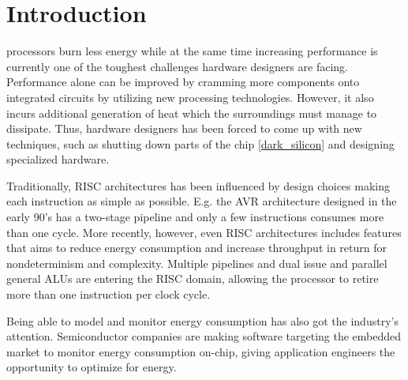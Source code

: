 \section{Introduction}

 processors burn less energy while at the same time
increasing performance is currently one of the toughest challenges hardware
designers are facing. Performance alone can be improved by cramming more
components onto integrated circuits \cite{moore1965cramming} by utilizing new
processing technologies. However, it also incurs additional generation of heat
which the surroundings must manage to dissipate. Thus, hardware designers has
been forced to come up with new techniques, such as shutting down parts of the
chip \ref{dark_silicon} and designing specialized hardware.

Traditionally, RISC architectures has been influenced by design choices making
each instruction as simple as possible\cite{sivarama}. E.g. the AVR architecture
designed in the early 90's has a two-stage pipeline and only a few instructions
consumes more than one cycle. More recently, however, even RISC architectures
includes features that aims to reduce energy consumption and increase throughput
in return for nondeterminism and complexity. Multiple pipelines and dual issue
and parallel general ALUs are entering the RISC domain, allowing the processor
to retire more than one instruction per clock cycle.



Being able to model and monitor energy consumption has also got the industry's
attention. Semiconductor companies are making software targeting the embedded
market to monitor energy consumption on-chip, giving application engineers the
opportunity to optimize for energy.



